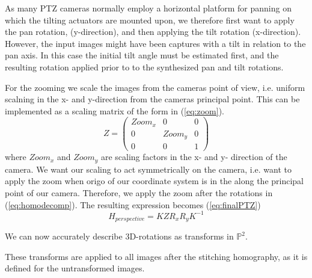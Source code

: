 As many PTZ cameras normally employ a horizontal platform for panning on which the tilting actuators are mounted upon, we therefore first want to apply the pan rotation, (y-direction), and then applying the tilt rotation (x-direction).
However, the input images might have been captures with a tilt in relation to the pan axis.
In this case the initial tilt angle must be estimated first, and the resulting rotation applied prior to to the synthesized pan and tilt rotations.

	For the zooming we scale the images from the cameras point of view, i.e. uniform scalning in the x- and y-direction from the cameras principal point. 
	This can be implemented as a scaling matrix of the form in (\ref{eq:zoom}).
	\begin{equation}
		Z=\begin{pmatrix} 
			Zoom_x & 0 & 0 \\
			0 & Zoom_y & 0 \\
			0 & 0 & 1
		\end{pmatrix}
		\label{eq:zoom}
	\end{equation}
	where $Zoom_x$ and $Zoom_y$ are scaling factors in the x- and y- direction of the camera.
	We want our scaling to act symmetrically on the camera, i.e. want to apply the zoom when origo of our coordinate system is in the along the principal point of our camera. 
	Therefore, we apply the zoom after the rotations in (\ref{eq:homodecomp}). The resulting expression becomes (\ref{eq:finalPTZ})
	\begin{equation}
		H_{perspective}=K Z  R_{x}R_{y}  K^{-1}
		\label{eq:finalPTZ}
	\end{equation}

	We can now accurately describe 3D-rotations as transforms in $\mathbb{P}^2$.

These transforms are applied to all images after the stitching homography, as it is defined for the untransformed images.
